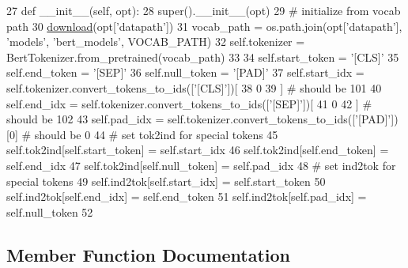 \begin{DoxyCode}
27     \textcolor{keyword}{def }\_\_init\_\_(self, opt):
28         super().\_\_init\_\_(opt)
29         \textcolor{comment}{# initialize from vocab path}
30         \hyperlink{namespaceparlai_1_1core_1_1build__data_ab74f0e428f05e5d91fa93c8afb367622}{download}(opt[\textcolor{stringliteral}{'datapath'}])
31         vocab\_path = os.path.join(opt[\textcolor{stringliteral}{'datapath'}], \textcolor{stringliteral}{'models'}, \textcolor{stringliteral}{'bert\_models'}, VOCAB\_PATH)
32         self.tokenizer = BertTokenizer.from\_pretrained(vocab\_path)
33 
34         self.start\_token = \textcolor{stringliteral}{'[CLS]'}
35         self.end\_token = \textcolor{stringliteral}{'[SEP]'}
36         self.null\_token = \textcolor{stringliteral}{'[PAD]'}
37         self.start\_idx = self.tokenizer.convert\_tokens\_to\_ids([\textcolor{stringliteral}{'[CLS]'}])[
38             0
39         ]  \textcolor{comment}{# should be 101}
40         self.end\_idx = self.tokenizer.convert\_tokens\_to\_ids([\textcolor{stringliteral}{'[SEP]'}])[
41             0
42         ]  \textcolor{comment}{# should be 102}
43         self.pad\_idx = self.tokenizer.convert\_tokens\_to\_ids([\textcolor{stringliteral}{'[PAD]'}])[0]  \textcolor{comment}{# should be 0}
44         \textcolor{comment}{# set tok2ind for special tokens}
45         self.tok2ind[self.start\_token] = self.start\_idx
46         self.tok2ind[self.end\_token] = self.end\_idx
47         self.tok2ind[self.null\_token] = self.pad\_idx
48         \textcolor{comment}{# set ind2tok for special tokens}
49         self.ind2tok[self.start\_idx] = self.start\_token
50         self.ind2tok[self.end\_idx] = self.end\_token
51         self.ind2tok[self.pad\_idx] = self.null\_token
52 
\end{DoxyCode}


\subsection{Member Function Documentation}
\mbox{\label{classparlai_1_1agents_1_1bert__ranker_1_1bert__dictionary_1_1BertDictionaryAgent_a35cefbd011319119e4a395afd6618ac6}} 
